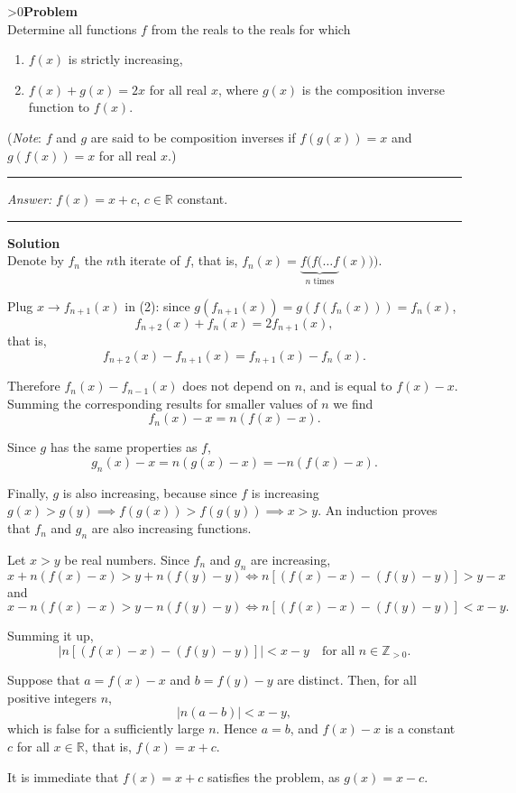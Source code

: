 \documentclass[12pt,oneside,a4paper]{book}
\newcounter{probnum}
\newcounter{solnum}
\newcommand{\prob}{\ifnum\value{probnum}>0\newpage\fi\setcounter{solnum}{0}\stepcounter{probnum}\textbf{Problem \theprobnum}\\}
\newcommand{\ans}{\medskip\hrule\medbreak\emph{Answer: }}
\newcommand{\sol}{\medskip\hrule\medbreak\textbf{Solution}\\}
\begin{document}
\prob Determine all functions $f$ from the reals to the reals for which
\begin{enumerate}[(1)]
\item $f(x)$ is strictly increasing,
\item $f(x)+g(x)=2x$ for all real $x$,
where $g(x)$ is the composition inverse function to $f(x)$.
\end{enumerate}
(\emph{Note}: $f$ and $g$ are said to be composition inverses if $f(g(x))=x$ and $g(f(x))=x$ for all real $x$.)

\ans $f(x) = x+c$, $c\in\mathbb{R}$ constant.

\sol
Denote by $f_n$ the $n$th iterate of $f$, that is, $f_n(x) = \underbrace{f(f(\ldots f}_{n\text{ times}}(x)))$.

Plug $x\to f_{n+1}(x)$ in (2): since $g(f_{n+1}(x)) = g(f(f_n(x))) = f_n(x)$,
\[f_{n+2}(x) + f_n(x) = 2f_{n+1}(x),\]
that is,
\[f_{n+2}(x) - f_{n+1}(x) = f_{n+1}(x) - f_n(x).\]

Therefore $f_n(x) - f_{n-1}(x)$ does not depend on $n$, and is equal to $f(x)-x$. Summing the corresponding results for smaller values of $n$ we find
\[f_n(x) - x = n(f(x)-x).\]

Since $g$ has the same properties as $f$,
\[g_n(x) - x = n(g(x)-x) = -n(f(x)-x).\]

Finally, $g$ is also increasing, because since $f$ is increasing $g(x) > g(y)\implies f(g(x)) > f(g(y)) \implies x > y$. An induction proves that $f_n$ and $g_n$ are also increasing functions.

Let $x>y$ be real numbers. Since $f_n$ and $g_n$ are increasing,
\[x + n(f(x)-x) > y + n(f(y)-y)\iff n[(f(x)-x) - (f(y)-y)] > y-x\]
and
\[x - n(f(x)-x) > y - n(f(y)-y)\iff n[(f(x)-x) - (f(y)-y)] < x-y.\]

Summing it up,
\[|n[(f(x)-x) - (f(y)-y)]| < x-y\quad\text{for all }n\in\mathbb{Z}_{>0}.\]

Suppose that $a = f(x)-x$ and $b = f(y)-y$ are distinct. Then, for all positive integers $n$,
\[|n(a-b)| < x-y,\]
which is false for a sufficiently large $n$. Hence $a=b$, and $f(x)-x$ is a constant $c$ for all $x\in\mathbb{R}$, that is, $f(x) = x+c$.

It is immediate that $f(x)=x+c$ satisfies the problem, as $g(x) = x-c$.
\end{document}
